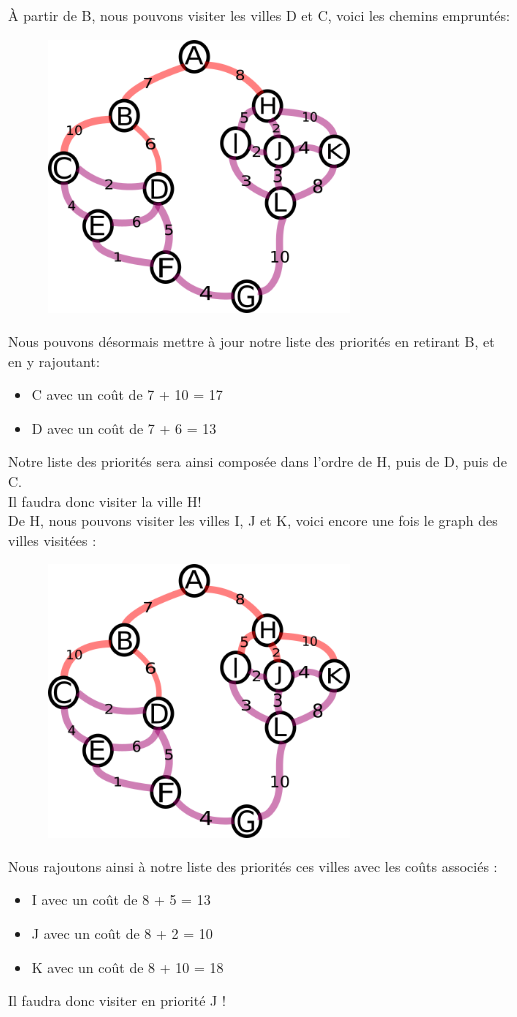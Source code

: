 \documentclass[a4paper, 12pt]{article}
\numberwithin{equation}{subsection}
\begin{document}
À partir de B, nous pouvons visiter les villes D et C, voici les chemins empruntés: \\
\begin{figure}[H]
  \centering
  \includegraphics[width=8.0cm]{imgs/third_search.png}
\end{figure}
Nous pouvons désormais mettre à jour notre liste des priorités en retirant B, et en y rajoutant: \\
\begin{itemize}
  \item C avec un coût de 7 + 10 = 17
  \item D avec un coût de 7 + 6 = 13
\end{itemize}
Notre liste des priorités sera ainsi composée dans l'ordre de H, puis de D, puis de C. \\

Il faudra donc visiter la ville H! \\

De H, nous pouvons visiter les villes I, J et K, voici encore une fois le graph des villes visitées : \\
\begin{figure}[H]
  \centering
  \includegraphics[width=8.0cm]{imgs/fourth_search.png}
\end{figure}
Nous rajoutons ainsi à notre liste des priorités ces villes avec les coûts associés : \\
\begin{itemize}
  \item I avec un coût de 8 + 5 = 13
  \item J avec un coût de 8 + 2 = 10
  \item K avec un coût de 8 + 10 = 18
\end{itemize}
Il faudra donc visiter en priorité J ! \\
\end{document}
